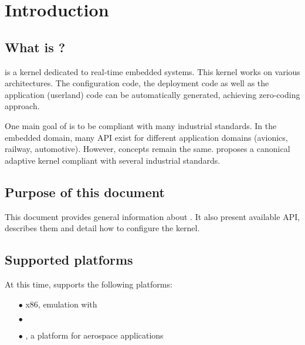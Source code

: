 %
% 
%
%
%
%
%


\chapter{Introduction}

   \section{What is \pok ?}
   \pok is a kernel dedicated to real-time embedded systems. This kernel works on
   various architectures. The configuration code, the deployment code as well as
   the application (userland) code can be automatically generated, achieving
   zero-coding approach.

   One main goal of \pok is to be compliant with many industrial standards. In
   the embedded domain, many API exist for different application domains
   (avionics, railway, automotive). However, concepts remain the same. \pok 
   proposes a canonical adaptive kernel compliant with several industrial
   standards.

   \section{Purpose of this document}
   This document provides general information about \pok. It also present
   available API, describes them and detail how to configure the kernel.

   \section{Supported platforms}
   At this time, \pok supports the following platforms:
   \begin{itemize}
      \item[$\bullet$]
         x86, emulation with \qemu
      \item[$\bullet$]
         \powerpc
      \item[$\bullet$]
         \leon, a platform for aerospace applications
   \end{itemize}

